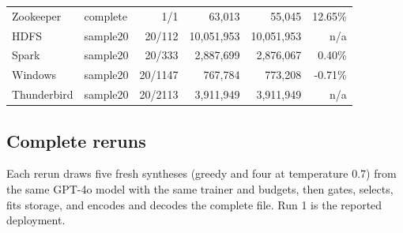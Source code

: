 \begin{longtable}{llrrrr}
Zookeeper & complete & 1/1 & 63,013 & 55,045 & 12.65\% \\

HDFS & sample20 & 20/112 & 10,051,953 & 10,051,953 & n/a \\

Spark & sample20 & 20/333 & 2,887,699 & 2,876,067 & 0.40\% \\

Windows & sample20 & 20/1147 & 767,784 & 773,208 & -0.71\% \\

Thunderbird & sample20 & 20/2113 & 3,911,949 & 3,911,949 & n/a \\

\bottomrule\end{longtable}

\subsection{Complete reruns}

Each rerun draws five fresh syntheses (greedy and four at temperature 0.7) from the same GPT-4o model with the same trainer and budgets, then gates, selects, fits storage, and encodes and decodes the complete file. Run 1 is the reported deployment.

